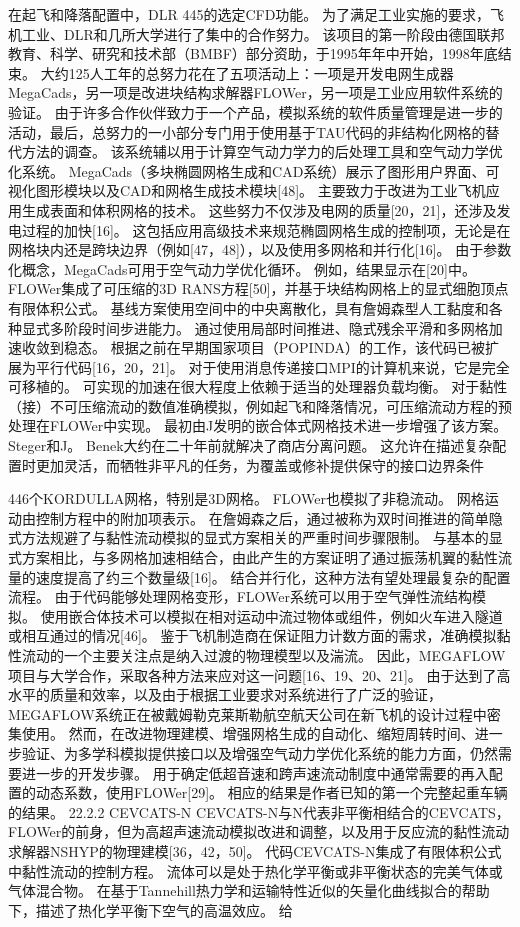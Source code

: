 \documentclass[UTF8,11pt,a4paper,openany,fontset=fandol]{ctexbook}
\begin{document}
在起飞和降落配置中，DLR 445的选定CFD功能。 为了满足工业实施的要求，飞机工业、DLR和几所大学进行了集中的合作努力。 该项目的第一阶段由德国联邦教育、科学、研究和技术部（BMBF）部分资助，于1995年年中开始，1998年底结束。 大约125人工年的总努力花在了五项活动上：一项是开发电网生成器MegaCads，另一项是改进块结构求解器FLOWer，另一项是工业应用软件系统的验证。 由于许多合作伙伴致力于一个产品，模拟系统的软件质量管理是进一步的活动，最后，总努力的一小部分专门用于使用基于TAU代码的非结构化网格的替代方法的调查。 该系统辅以用于计算空气动力学力的后处理工具和空气动力学优化系统。 MegaCads（多块椭圆网格生成和CAD系统）展示了图形用户界面、可视化图形模块以及CAD和网格生成技术模块[48]。 主要致力于改进为工业飞机应用生成表面和体积网格的技术。 这些努力不仅涉及电网的质量[20，21]，还涉及发电过程的加快[16]。 这包括应用高级技术来规范椭圆网格生成的控制项，无论是在网格块内还是跨块边界（例如[47，48]），以及使用多网格和并行化[16]。 由于参数化概念，MegaCads可用于空气动力学优化循环。 例如，结果显示在[20]中。 FLOWer集成了可压缩的3D RANS方程[50]，并基于块结构网格上的显式细胞顶点有限体积公式。 基线方案使用空间中的中央离散化，具有詹姆森型人工黏度和各种显式多阶段时间步进能力。 通过使用局部时间推进、隐式残余平滑和多网格加速收敛到稳态。 根据之前在早期国家项目（POPINDA）的工作，该代码已被扩展为平行代码[16，20，21]。 对于使用消息传递接口MPI的计算机来说，它是完全可移植的。 可实现的加速在很大程度上依赖于适当的处理器负载均衡。 对于黏性（接）不可压缩流动的数值准确模拟，例如起飞和降落情况，可压缩流动方程的预处理在FLOWer中实现。 最初由J发明的嵌合体式网格技术进一步增强了该方案。 Steger和J。 Benek大约在二十年前就解决了商店分离问题。 这允许在描述复杂配置时更加灵活，而牺牲非平凡的任务，为覆盖或修补提供保守的接口边界条件

446个KORDULLA网格，特别是3D网格。 FLOWer也模拟了非稳流动。 网格运动由控制方程中的附加项表示。 在詹姆森之后，通过被称为双时间推进的简单隐式方法规避了与黏性流动模拟的显式方案相关的严重时间步骤限制。 与基本的显式方案相比，与多网格加速相结合，由此产生的方案证明了通过振荡机翼的黏性流量的速度提高了约三个数量级[16]。 结合并行化，这种方法有望处理最复杂的配置流程。 由于代码能够处理网格变形，FLOWer系统可以用于空气弹性流结构模拟。 使用嵌合体技术可以模拟在相对运动中流过物体或组件，例如火车进入隧道或相互通过的情况[46]。 鉴于飞机制造商在保证阻力计数方面的需求，准确模拟黏性流动的一个主要关注点是纳入过渡的物理模型以及湍流。 因此，MEGAFLOW项目与大学合作，采取各种方法来应对这一问题[16、19、20、21]。 由于达到了高水平的质量和效率，以及由于根据工业要求对系统进行了广泛的验证，MEGAFLOW系统正在被戴姆勒克莱斯勒航空航天公司在新飞机的设计过程中密集使用。 然而，在改进物理建模、增强网格生成的自动化、缩短周转时间、进一步验证、为多学科模拟提供接口以及增强空气动力学优化系统的能力方面，仍然需要进一步的开发步骤。 用于确定低超音速和跨声速流动制度中通常需要的再入配置的动态系数，使用FLOWer[29]。 相应的结果是作者已知的第一个完整起重车辆的结果。 22.2.2 CEVCATS-N CEVCATS-N与N代表非平衡相结合的CEVCATS，FLOWer的前身，但为高超声速流动模拟改进和调整，以及用于反应流的黏性流动求解器NSHYP的物理建模[36，42，50]。 代码CEVCATS-N集成了有限体积公式中黏性流动的控制方程。 流体可以是处于热化学平衡或非平衡状态的完美气体或气体混合物。 在基于Tannehill热力学和运输特性近似的矢量化曲线拟合的帮助下，描述了热化学平衡下空气的高温效应。 给
\end{document}
